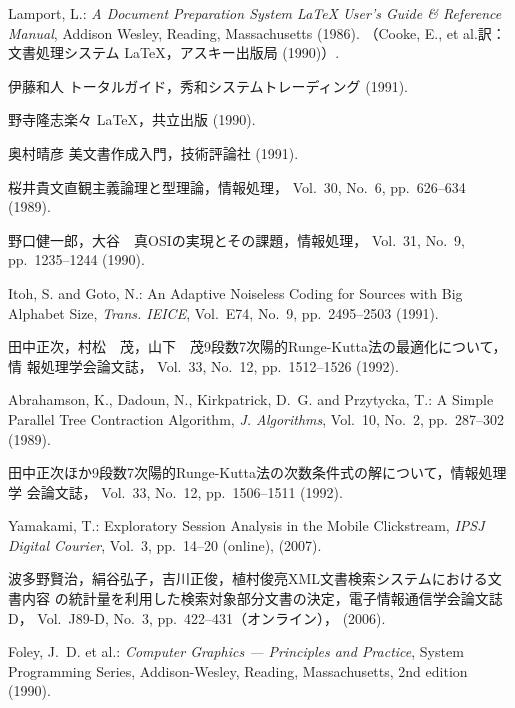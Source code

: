 \begin{thebibliography}{10}

Lamport, L.: {\em A Document Preparation System {\LaTeX} User's Guide \&
  Reference Manual}, Addison Wesley, Reading, Massachusetts (1986).
\newblock （Cooke, E., et al.訳：文書処理システム {\LaTeX}，アスキー出版局
  (1990)）.

伊藤和人\：{\LaTeX} トータルガイド，秀和システムトレーディング (1991).

野寺隆志\：楽々 {\LaTeX}，共立出版 (1990).

奥村晴彦\：{\LaTeX} 美文書作成入門，技術評論社 (1991).

桜井貴文\：直観主義論理と型理論，情報処理， Vol.~30, No.~6, pp.\ 626--634
  (1989).

野口健一郎，大谷　真\：OSIの実現とその課題，情報処理， Vol.~31, No.~9, pp.\
  1235--1244 (1990).

Itoh, S. and Goto, N.: An Adaptive Noiseless Coding for Sources with Big
  Alphabet Size, {\em Trans. IEICE},  Vol.~E74, No.~9, pp.\ 2495--2503 (1991).

田中{正次}，村松　茂，山下　茂\：9段数7次陽的Runge-Kutta法の最適化について，情%
報処理学会論文誌， Vol.~33, No.~12, pp.\ 1512--1526 (1992).

Abrahamson, K., Dadoun, N., Kirkpatrick, D.~G. and Przytycka, T.: A Simple
  Parallel Tree Contraction Algorithm, {\em J. Algorithms},  Vol.~10, No.~2,
  pp.\ 287--302 (1989).

田中{正次}ほか\：9段数7次陽的Runge-Kutta法の次数条件式の解について，情報処理学%
会論文誌， Vol.~33, No.~12, pp.\ 1506--1511 (1992).

Yamakami, T.: Exploratory Session Analysis in the Mobile Clickstream, {\em IPSJ
  Digital Courier},  Vol.~3, pp.\ 14--20 (online), \doi{10.2197/ipsjdc.3.14}
  (2007).

波多野賢治，絹谷弘子，吉川正俊，植村俊亮\：XML文書検索システムにおける文書内容%
の統計量を利用した検索対象部分文書の決定，電子情報通信学会論文誌D， Vol.~J89-D,
  No.~3, pp.\ 422--431（オンライン）， (2006).

Foley, J.~D. et al.: {\em Computer Graphics --- Principles and Practice},
  System Programming Series, Addison-Wesley, Reading, Massachusetts, 2nd
  edition (1990).


\end{thebibliography}
